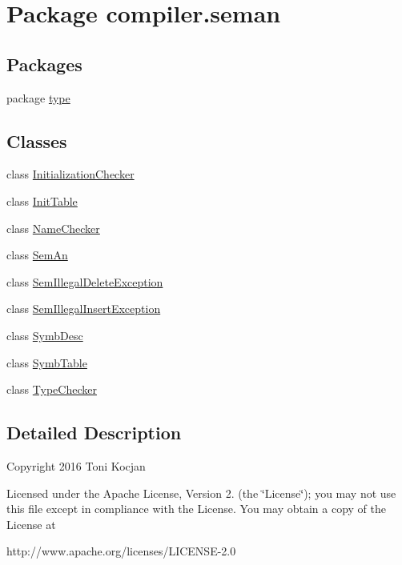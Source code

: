 \hypertarget{namespacecompiler_1_1seman}{}\section{Package compiler.\+seman}
\label{namespacecompiler_1_1seman}
\subsection*{Packages}
\begin{DoxyCompactItemize}
\item 
package \hyperlink{namespacecompiler_1_1seman_1_1type}{type}
\end{DoxyCompactItemize}
\subsection*{Classes}
\begin{DoxyCompactItemize}
\item 
class \hyperlink{classcompiler_1_1seman_1_1_initialization_checker}{Initialization\+Checker}
\item 
class \hyperlink{classcompiler_1_1seman_1_1_init_table}{Init\+Table}
\item 
class \hyperlink{classcompiler_1_1seman_1_1_name_checker}{Name\+Checker}
\item 
class \hyperlink{classcompiler_1_1seman_1_1_sem_an}{Sem\+An}
\item 
class \hyperlink{classcompiler_1_1seman_1_1_sem_illegal_delete_exception}{Sem\+Illegal\+Delete\+Exception}
\item 
class \hyperlink{classcompiler_1_1seman_1_1_sem_illegal_insert_exception}{Sem\+Illegal\+Insert\+Exception}
\item 
class \hyperlink{classcompiler_1_1seman_1_1_symb_desc}{Symb\+Desc}
\item 
class \hyperlink{classcompiler_1_1seman_1_1_symb_table}{Symb\+Table}
\item 
class \hyperlink{classcompiler_1_1seman_1_1_type_checker}{Type\+Checker}
\end{DoxyCompactItemize}


\subsection{Detailed Description}
Copyright 2016 Toni Kocjan

Licensed under the Apache License, Version 2. (the \char`\"{}\+License\char`\"{}); you may not use this file except in compliance with the License. You may obtain a copy of the License at \begin{DoxyVerb}http://www.apache.org/licenses/LICENSE-2.0
\end{DoxyVerb}


